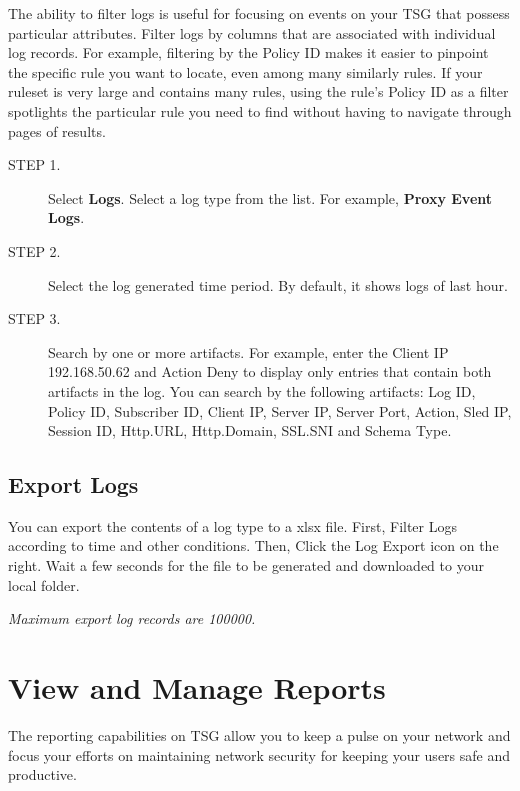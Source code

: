 The ability to filter logs is useful for focusing on events on your TSG that possess particular attributes. Filter logs by columns that are associated with individual log records. For example, filtering by the Policy ID makes it easier to pinpoint the specific rule you want to locate, even among many similarly rules. If your ruleset is very large and contains many rules, using the rule’s Policy ID as a filter spotlights the particular rule you need to find without having to navigate through pages of results. 


\begin{description}
    \item[STEP 1.]	Select \textbf{Logs}. Select a log type from the list. For example, \textbf{Proxy Event Logs}.
    \item[STEP 2.]	Select the log generated time period. By default, it shows logs of last hour.
    \item[STEP 3.]	Search by one or more artifacts. For example, enter the Client IP 192.168.50.62 and Action Deny to display only entries that contain both artifacts in the log. You can search by the following artifacts: Log ID, Policy ID, Subscriber ID, Client IP, Server IP, Server Port, Action, Sled IP, Session ID, Http.URL, Http.Domain, SSL.SNI and Schema Type.
\end{description}

\subsection*{\hypertarget{link:Export Logs}{Export Logs}}
\label{sec:monitor:log:export}

You can export the contents of a log type to a xlsx file. First, Filter Logs according to time and other conditions. Then, Click the Log Export icon on the right. Wait a few seconds for the file to be generated and downloaded to your local folder. 


\notemark\textit{Maximum export log records are 100000.}

\section*{\hypertarget{link:View and Manage Reports}{View and Manage Reports}}
\label{sec:monitor:report}

The reporting capabilities on TSG allow you to keep a pulse on your network and focus your efforts on maintaining network security for keeping your users safe and productive.


